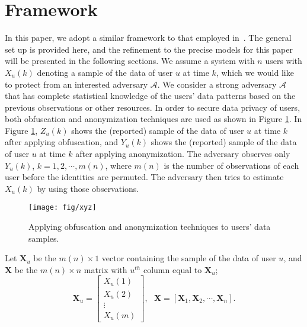 \section{Framework}
\label{sec:framework}
In this paper, we adopt a similar framework to that employed in~\cite{tifs2016,ciss2017}.  The general set up is provided here, and the refinement to the precise models for this paper will be presented in the following sections.  We assume a system with $n$ users with $X_u(k)$ denoting a sample of the data of user $u$ at time $k$, which we would like to protect from an interested adversary $\mathcal{A}$. We consider a strong adversary $\mathcal{A}$ that has complete statistical knowledge of the users' data patterns based on the previous observations or other resources. In order to secure data privacy of users, both obfuscation and anonymization techniques are used as shown in Figure \ref{fig:xyz}. In Figure \ref{fig:xyz}, $Z_u(k)$ shows the (reported) sample of the data of user $u$ at time $k$ after applying obfuscation, and $Y_u(k)$ shows the (reported) sample of the data of user $u$ at time $k$ after applying anonymization. The adversary observes only $Y_u(k)$, $k=1,2,\cdots, m(n)$, where $m(n)$ is the number of observations of each user before the identities are permuted. The adversary then tries to estimate $X_u(k)$ by using those observations.
\begin{figure}[h]
	\centering
	\texttt{[image: fig/xyz]}
	\caption{Applying obfuscation and anonymization techniques to users' data samples.}
	\label{fig:xyz}
\end{figure}

Let $\textbf{X}_u$ be the $m(n) \times 1$ vector containing the sample of the data of user $u$, and $\textbf{X}$ be the $m(n) \times n$ matrix with $u^{th}$ column equal to $\textbf{X}_u$;
\[\textbf{X}_u = \begin{bmatrix}
X_u(1) \\ X_u(2) \\ \vdots \\X_u(m) \end{bmatrix} , \ \ \  \textbf{X} =\left[\textbf{X}_{1}, \textbf{X}_{2}, \cdots,  \textbf{X}_{n}\right].
\]



